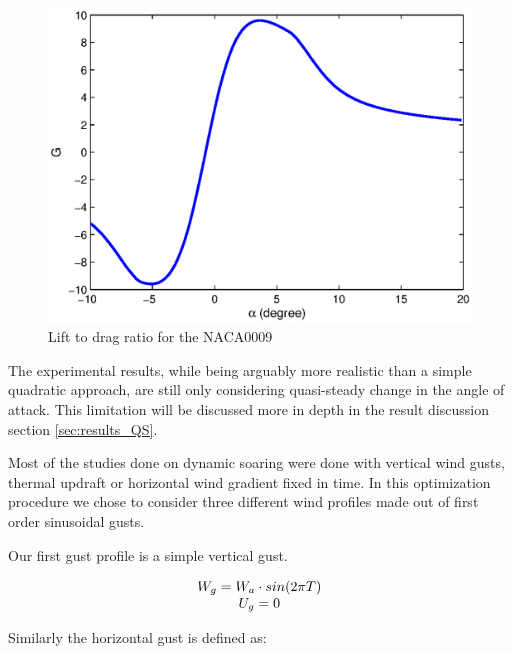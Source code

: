 \begin{figure}[ht]
\begin{center}
   \includegraphics{./Figures/NACA0009_steady_map_G.eps}
\end{center}
\caption{Lift to drag ratio for the NACA0009}
\label{fig:G_vs_alpha_qs}
\end{figure}

\par The experimental results, while being arguably more realistic than a simple quadratic approach, are still only considering quasi-steady change in the angle of attack.
This limitation will be discussed more in depth in the result discussion section \ref{sec:results_QS}.

\FloatBarrier
{}
Most of the studies done on dynamic soaring were done with vertical wind gusts, thermal updraft or horizontal wind gradient fixed in time.
In this optimization procedure we chose to consider three different wind profiles made out of first order sinusoidal gusts.

\par Our first gust profile is a simple vertical gust.

\begin{equation}
\begin{array}[c]{c}
  W_g = W_a \cdot sin(2\pi T) \\
  U_g = 0 
\end{array}
\label{eqn:vertical_gust_definition}
\end{equation}

\par Similarly the horizontal gust is defined as:

